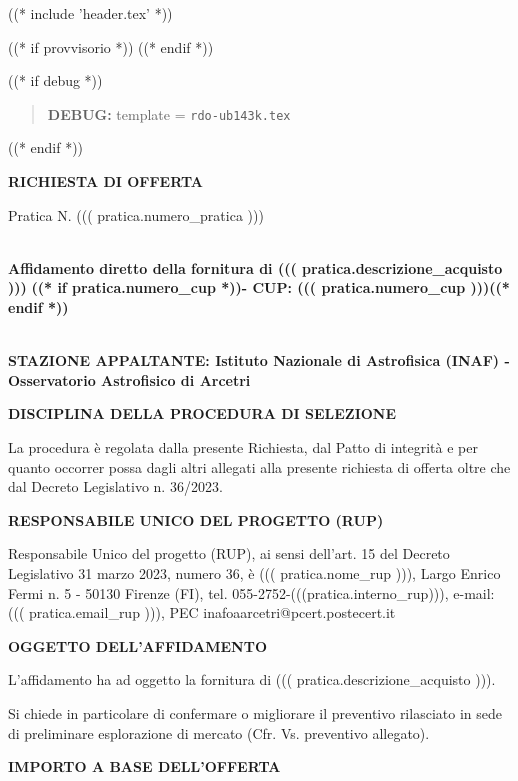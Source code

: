 
((* include 'header.tex' *))

((* if provvisorio *))
((* endif *))



\topaddr

((* if debug *))
\begin{quotation}
	\textbf{DEBUG:} template = \texttt{rdo-ub143k.tex}
\end{quotation}
((* endif *))

\begin{center}
\textbf{RICHIESTA DI OFFERTA}
\end{center}

Pratica N. ((( pratica.numero_pratica )))


~\\
\textbf{Affidamento diretto della fornitura di ((( pratica.descrizione_acquisto )))}
\textbf{((* if pratica.numero_cup *))- CUP: ((( pratica.numero_cup )))((* endif *))}


~\\
\textbf{STAZIONE APPALTANTE: Istituto Nazionale di Astrofisica (INAF) - Osservatorio Astrofisico di Arcetri}

\textbf{DISCIPLINA DELLA PROCEDURA DI SELEZIONE}

La procedura è regolata dalla presente Richiesta, dal Patto di integrità
e per quanto occorrer possa dagli altri allegati alla presente richiesta
di offerta oltre che dal Decreto Legislativo n. 36/2023.


\textbf{RESPONSABILE UNICO DEL PROGETTO (RUP)}

Responsabile Unico del progetto (RUP), ai sensi dell'art. 15 del
Decreto Legislativo 31 marzo 2023, numero 36, è
 ((( pratica.nome_rup ))), Largo Enrico Fermi n. 5 - 50130 Firenze
 (FI), tel. 055-2752-(((pratica.interno_rup))),
e-mail: ((( pratica.email_rup ))), PEC inafoaarcetri@pcert.postecert.it


\textbf{OGGETTO DELL'AFFIDAMENTO}

L'affidamento ha ad oggetto la fornitura di  ((( pratica.descrizione_acquisto ))).

Si chiede in particolare di confermare o migliorare il preventivo
rilasciato in sede di preliminare esplorazione di mercato (Cfr. Vs. preventivo allegato).

\textbf{IMPORTO A BASE DELL'OFFERTA}

